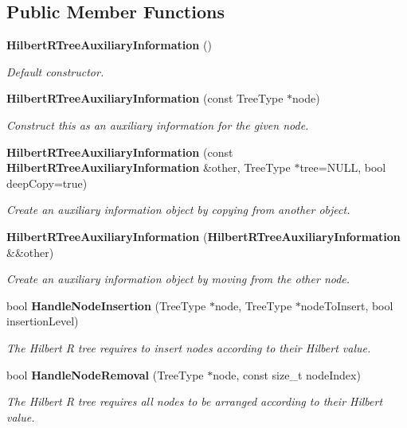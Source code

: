 \subsection*{Public Member Functions}
\begin{DoxyCompactItemize}
\item 
{\bf Hilbert\+R\+Tree\+Auxiliary\+Information} ()
\begin{DoxyCompactList}\small\item\em Default constructor. \end{DoxyCompactList}\item 
{\bf Hilbert\+R\+Tree\+Auxiliary\+Information} (const Tree\+Type $\ast$node)
\begin{DoxyCompactList}\small\item\em Construct this as an auxiliary information for the given node. \end{DoxyCompactList}\item 
{\bf Hilbert\+R\+Tree\+Auxiliary\+Information} (const {\bf Hilbert\+R\+Tree\+Auxiliary\+Information} \&other, Tree\+Type $\ast$tree=N\+U\+LL, bool deep\+Copy=true)
\begin{DoxyCompactList}\small\item\em Create an auxiliary information object by copying from another object. \end{DoxyCompactList}\item 
{\bf Hilbert\+R\+Tree\+Auxiliary\+Information} ({\bf Hilbert\+R\+Tree\+Auxiliary\+Information} \&\&other)
\begin{DoxyCompactList}\small\item\em Create an auxiliary information object by moving from the other node. \end{DoxyCompactList}\item 
bool {\bf Handle\+Node\+Insertion} (Tree\+Type $\ast$node, Tree\+Type $\ast$node\+To\+Insert, bool insertion\+Level)
\begin{DoxyCompactList}\small\item\em The Hilbert R tree requires to insert nodes according to their Hilbert value. \end{DoxyCompactList}\item 
bool {\bf Handle\+Node\+Removal} (Tree\+Type $\ast$node, const size\+\_\+t node\+Index)
\begin{DoxyCompactList}\small\item\em The Hilbert R tree requires all nodes to be arranged according to their Hilbert value. \end{DoxyCompactList}\item 

\end{DoxyCompactItemize}
